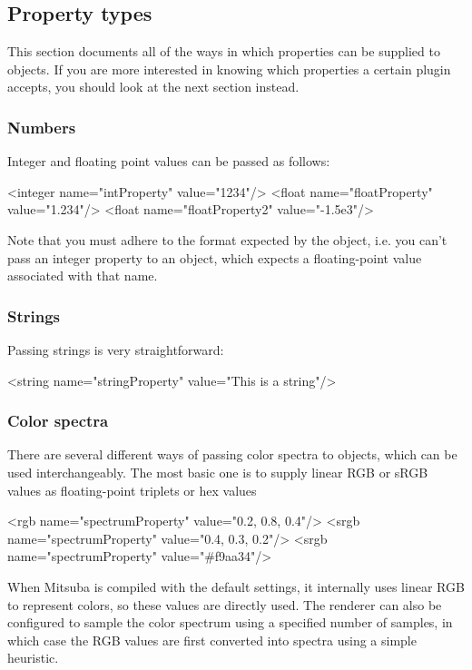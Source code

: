 \subsection{Property types}
This section documents all of the ways in which properties can be supplied to objects. If you are more
interested in knowing which properties a certain plugin accepts, you should look at the next section instead.
\subsubsection{Numbers}
Integer and floating point values can be passed as follows:
\begin{xml}
<integer name="intProperty" value="1234"/>
<float name="floatProperty" value="1.234"/>
<float name="floatProperty2" value="-1.5e3"/>
\end{xml}
Note that you must adhere to the format expected by the object, i.e. you can't pass an integer property
to an object, which expects a floating-point value associated with that name.
\subsubsection{Strings}
Passing strings is very straightforward:
\begin{xml}
<string name="stringProperty" value="This is a string"/>
\end{xml}
\subsubsection{Color spectra}
There are several different ways of passing color spectra to objects, which can be used interchangeably.
The most basic one is to supply linear RGB or sRGB values as floating-point triplets or hex values
\begin{xml}
<rgb name="spectrumProperty" value="0.2, 0.8, 0.4"/>
<srgb name="spectrumProperty" value="0.4, 0.3, 0.2"/>
<srgb name="spectrumProperty" value="#f9aa34"/>
\end{xml}
When Mitsuba is compiled with the default settings, it internally uses linear RGB to represent colors, so
these values are directly used. The renderer can also be configured to sample the color spectrum using a specified
number of samples, in which case the RGB values are first converted into spectra using a simple heuristic.


